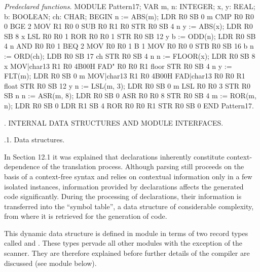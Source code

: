 \noindent {} \emph{Predeclared functions.}
\begintt
MODULE Pattern17;
  VAR m, n: INTEGER;
      x, y: REAL;
      b: BOOLEAN; ch: CHAR;
BEGIN
  n := ABS(m);          LDR R0 SB 0       m
                        CMP R0 R0 0
                        BGE 2
                        MOV R1 R0 0
                        SUB R0 R1 R0
                        STR R0 SB 4       n
  y := ABS(x);          LDR R0 SB 8       x
                        LSL R0 R0 1
                        ROR R0 R0 1
                        STR R0 SB 12      y
  b := ODD(n);          LDR R0 SB 4       n
                        AND R0 R0 1
                        BEQ 2
                        MOV R0 R0 1
                        B 1
                        MOV R0 R0 0
                        STB R0 SB 16      b
  n := ORD(ch);         LDB R0 SB 17      ch
                        STR R0 SB 4       n
  n := FLOOR(x);        LDR R0 SB 8       x
                        MOV|char13 R1 R0 4B00H
                        FAD" R0 R0 R1     floor
                        STR R0 SB 4       n
  y := FLT(m);          LDR R0 SB 0       m
                        MOV|char13 R1 R0 4B00H
                        FAD|char13 R0 R0 R1     float
                        STR R0 SB 12      y
  n := LSL(m, 3);       LDR R0 SB 0       m
                        LSL R0 R0 3
                        STR R0 SB         n
  n := ASR(m, 8);       LDR R0 SB 0
                        ASR R0 R0 8
                        STR R0 SB 4
  m := ROR(m, n);       LDR R0 SB 0
                        LDR R1 SB 4
                        ROR R0 R0 R1
                        STR R0 SB 0
END Pattern17.
\endtt

. INTERNAL DATA STRUCTURES AND MODULE INTERFACES.

.1. Data structures.

In Section 12.1 it was explained that declarations inherently constitute context-dependence of the translation process. Although parsing still proceeds on the basis of a context-free syntax and relies on contextual information only in a few isolated instances, information provided by declarations affects the generated code significantly. During the processing of declarations, their information is transferred into the ``symbol table'', a data structure of considerable complexity, from where it is retrieved for the generation of code.

This dynamic data structure is defined in module  in terms of two record types called  and . These types pervade all other modules with the exception of the scanner. They are therefore explained before further details of the compiler are discussed (see module  below).

